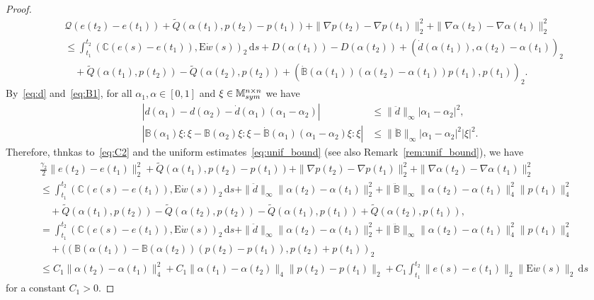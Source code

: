 \documentclass[10pt,a4paper]{amsart}
\def\B {\mathbb B}
\def\C {\mathbb C}
\def\EE {\mathrm{E}}
\def\M {\mathbb M^{n\times n}_{\rm sym}}
\def\de {\mathrm{d}}
\begin{document}
\begin{proof}
\begin{align*}
&\mathcal Q(e(t_2)-e(t_1))+\tilde Q(\alpha(t_1),p(t_2)-p(t_1))+\|\nabla p(t_2)-\nabla p(t_1)\|_2^2+  \|\nabla \alpha(t_2)-\nabla \alpha(t_1)\|_2^2\\
&\le \int_{t_1}^{t_2}(\C (e(s)-e(t_1)),\EE \dot w(s))_2\,\de s+D(\alpha(t_1))-D(\alpha(t_2))+(\dot{d}(\alpha(t_1)),\alpha(t_2)-\alpha(t_1))_2\\
&\quad+\tilde Q(\alpha(t_1),p(t_2))-\tilde Q(\alpha(t_2),p(t_2))+(\dot{\B}(\alpha(t_1))(\alpha(t_2)-\alpha(t_1))p(t_1),p(t_1))_2.
\end{align*}
By~\eqref{eq:d} and~\eqref{eq:B1}, for all $\alpha_1,\alpha\in [0,1]$ and $\xi\in\M$ we have
\begin{align*}
|d(\alpha_1)-d(\alpha_2)-\dot{d}(\alpha_1)(\alpha_1-\alpha_2)| &\le \|\ddot{d}\|_\infty|\alpha_1-\alpha_2|^2,\\
|\B(\alpha_1)\xi:\xi-\B(\alpha_2)\xi:\xi-\dot{\B}(\alpha_1)(\alpha_1-\alpha_2)\xi:\xi| &\le \|\ddot{\B}\|_\infty|\alpha_1-\alpha_2|^2|\xi|^2.
\end{align*}
Therefore, thnkas to~\eqref{eq:C2} and the uniform estimates~\eqref{eq:unif_bound} (see also Remark~\ref{rem:unif_bound}), we have
\begin{align}
&\frac{\gamma_2}{2}\|e(t_2)-e(t_1)\|_2^2+\tilde Q(\alpha(t_1),p(t_2)-p(t_1))+\|\nabla p(t_2)-\nabla p(t_1)\|_2^2+  \|\nabla \alpha(t_2)-\nabla \alpha(t_1)\|_2^2\nonumber\\
&\le \int_{t_1}^{t_2}(\C (e(s)-e(t_1)),\EE \dot w(s))_2\,\de s+\|\ddot{d}\|_\infty\|\alpha(t_2)-\alpha(t_1)\|_2^2+\|\ddot{\B}\|_\infty\|\alpha(t_2)-\alpha(t_1)\|_4^2\|p(t_1)\|_4^2\nonumber\\
&\quad+\tilde Q(\alpha(t_1),p(t_2))-\tilde Q(\alpha(t_2),p(t_2))-\tilde Q(\alpha(t_1),p(t_1))+\tilde Q(\alpha(t_2),p(t_1)),\nonumber\\
&=\int_{t_1}^{t_2}(\C (e(s)-e(t_1)),\EE \dot w(s))_2\,\de s+\|\ddot{d}\|_\infty\|\alpha(t_2)-\alpha(t_1)\|_2^2+\|\ddot{\B}\|_\infty\|\alpha(t_2)-\alpha(t_1)\|_4^2\|p(t_1)\|_4^2\nonumber\\
&\quad+((\B(\alpha(t_1))-\B(\alpha(t_2))(p(t_2)-p(t_1)),p(t_2)+p(t_1))_2\nonumber\\
&\le C_1\|\alpha(t_2)-\alpha(t_1)\|_4^2+C_1\|\alpha(t_1)-\alpha(t_2)\|_4\|p(t_2)-p(t_1)\|_2+C_1\int_{t_1}^{t_2}\|e(s)-e(t_1)\|_2\|\EE \dot w(s)\|_2\,\de s\label{eq:part1}
\end{align}
for a constant $C_1>0$.


\end{proof}
\end{document}

